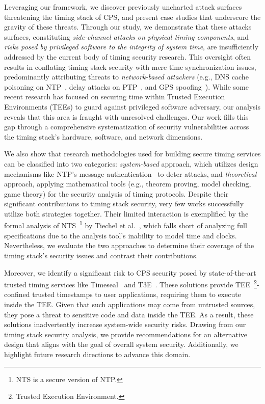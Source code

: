 Leveraging our framework, we discover previously uncharted attack surfaces threatening the timing stack of CPS, and present case studies that underscore the gravity of these threats. Through our study, we demonstrate that these attacks surfaces, constituting \textit{side-channel attacks on physical timing components}, and \textit{risks posed by privileged software to the integrity of system time}, are insufficiently addressed by the current body of timing security research. This oversight often results in conflating timing stack security with mere time synchronization issues, predominantly attributing threats to \textit{network-based attackers} (e.g., DNS cache poisoning on NTP~\cite{shark-ntp-pool}, delay attacks on PTP~\cite{ptp-futile-encryption}, and GPS spoofing~\cite{intro-attacks-critical}). While some recent research has focused on securing time within Trusted Execution Environments (TEEs) to guard against privileged software adversary, our analysis reveals that this area is fraught with unresolved challenges. Our work fills this gap through a comprehensive systematization of security vulnerabilities across the timing stack's hardware, software, and network dimensions.

We also show that research methodologies used for building secure timing services can be classified into two categories: \textit{system-based} approach, which utilizes design mechanisms like NTP's message authentication~\cite{ntpv4-rfc} to deter attacks, and \textit{theoretical} approach, applying mathematical tools (e.g., theorem proving, model checking, game theory) for the security analysis of timing protocols. Despite their significant contributions to timing stack security, very few works successfully utilize both strategies together. Their limited interaction is exemplified by the formal analysis of NTS~\footnote{NTS is a secure version of NTP.} by Tiechel et al.~\cite{theory-nts-formal-analysis}, which falls short of analyzing full specifications due to the analysis tool's inability to model time and clocks. Nevertheless, we evaluate the two approaches to determine their coverage of the timing stack's security issues and contrast their contributions.

Moreover, we identify a significant risk to CPS security posed by state-of-the-art trusted timing services like Timeseal~\cite{time-stack-timeseal} and T3E~\cite{trusted-time-t3e}. These solutions provide TEE~\footnote{Trusted Execution Environment.}-confined trusted timestamps to user applications, requiring them to execute inside the TEE. Given that such applications may come from untrusted sources, they pose a threat to sensitive code and data inside the TEE. As a result, these solutions inadvertently increase system-wide security risks. Drawing from our timing stack security analysis, we provide recommendations for an alternative design that aligns with the goal of overall system security. Additionally, we highlight future research directions to advance this domain.

